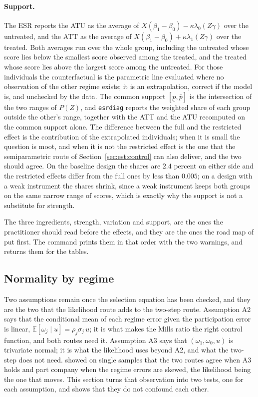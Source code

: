 \documentclass[11pt,a4paper]{article}
\theoremstyle{plain}
\theoremstyle{definition}
\theoremstyle{remark}
\newcommand{\E}{\mathbb{E}}
\newcommand{\1}{\mathbf{1}}
\newcommand{\cmd}[1]{\texttt{#1}}
\begin{document}
\paragraph{Support.}
The ESR reports the ATU as the average of
$X(\beta_1-\beta_0)-\kappa\lambda_0(Z\gamma)$ over the untreated, and the
ATT as the average of $X(\beta_1-\beta_0)+\kappa\lambda_1(Z\gamma)$ over
the treated. Both averages run over the whole group, including the
untreated whose score lies below the smallest score observed among the
treated, and the treated whose score lies above the largest score among
the untreated. For those individuals the counterfactual is the
parametric line evaluated where no observation of the other regime
exists; it is an extrapolation, correct if the model is, and unchecked by
the data. The common support $[\underline p,\bar p]$ is the intersection
of the two ranges of $P(Z)$, and \cmd{esrdiag} reports the weighted share
of each group outside the other's range, together with the ATT and the
ATU recomputed on the common support alone. The difference between the
full and the restricted effect is the contribution of the extrapolated
individuals; when it is small the question is moot, and when it is not
the restricted effect is the one that the semiparametric route of
Section~\ref{sec:est:control} can also deliver, and the two should agree.
On the baseline design the shares are $2.4$ percent on either side and
the restricted effects differ from the full ones by less than $0.005$; on
a design with a weak instrument the shares shrink, since a weak
instrument keeps both groups on the same narrow range of scores, which is
exactly why the support is not a substitute for strength.

The three ingredients, strength, variation and support, are the ones the
practitioner should read before the effects, and they are the ones the
road map of \citet{araar2026sog} put first. The command prints them in
that order with the two warnings, and returns them for the tables.

\subsection{Normality by regime}\label{sec:tests:normal}

Two assumptions remain once the selection equation has been checked, and
they are the two that the likelihood route adds to the two-step route.
Assumption A2 says that the conditional mean of each regime error given
the participation error is linear, $\E[\omega_j\mid u]=\rho_j\sigma_j\,u$;
it is what makes the Mills ratio the right control function, and both
routes need it. Assumption A3 says that $(\omega_1,\omega_0,u)$ is
trivariate normal; it is what the likelihood uses beyond A2, and what the
two-step does not need. \citet{araar2026msat} showed on single samples
that the two routes agree when A3 holds and part company when the regime
errors are skewed, the likelihood being the one that moves. This section
turns that observation into two tests, one for each assumption, and shows
that they do not confound each other.
\end{document}
